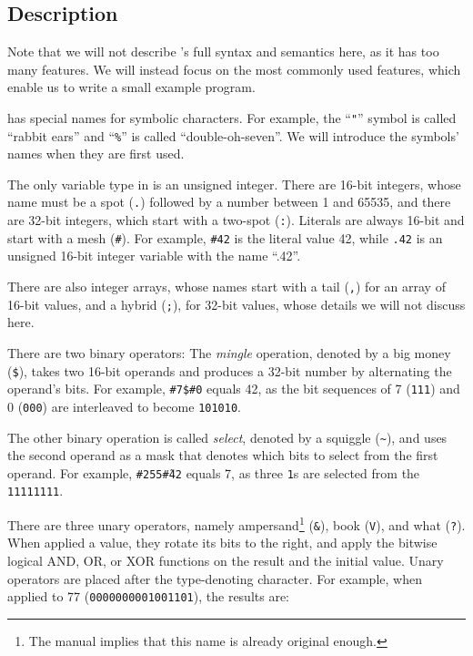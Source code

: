 \subsection{Description}

Note that we will not describe \ic{}'s full syntax and semantics here, as it has too many features. We will instead focus on the most commonly used features, which enable us to write a small example program.

\ic{} has special names for symbolic characters. For example, the “\texttt{"}” symbol is called “rabbit ears” and “\texttt{\%}” is called “double-oh-seven”. We will introduce the symbols' names when they are first used.

    The only variable type in \ic{} is an unsigned integer. There are 16-bit integers, whose name must be a spot (\texttt{.}) followed by a number between 1 and 65535, and there are 32-bit integers, which start with a two-spot (\texttt{:}). Literals are always 16-bit and start with a mesh (\texttt{\#}). For example, \texttt{\#42} is the literal value 42, while \texttt{.42} is an unsigned 16-bit integer variable with the name “.42”.

There are also integer arrays, whose names start with a tail (\texttt{,}) for an array of 16-bit values, and a hybrid (\texttt{;}), for 32-bit values, whose details we will not discuss here.

There are two binary operators: The \emph{mingle} operation, denoted by a big money (\texttt{\$}), takes two 16-bit operands and produces a 32-bit number by alternating the operand's bits. For example, \texttt{\#7\$\#0} equals 42, as the bit sequences of 7 (\texttt{111}) and 0 (\texttt{000}) are interleaved to become \texttt{101010}.

The other binary operation is called \emph{select}, denoted by a squiggle (\texttt{\~}), and uses the second operand as a mask that denotes which bits to select from the first operand. For example, \texttt{\#255\~\#42} equals 7, as three \texttt{1}s are selected from the \texttt{11111111}.

There are three unary operators, namely ampersand\footnote{The manual implies that this name is already original enough.} (\texttt{\&}), book (\texttt{V}), and what (\texttt{?}). When applied a value, they rotate its bits to the right, and apply the bitwise logical AND, OR, or XOR functions on the result and the initial value. Unary operators are placed after the type-denoting character. For example, when applied to 77 (\texttt{0000000001001101}), the results are:

